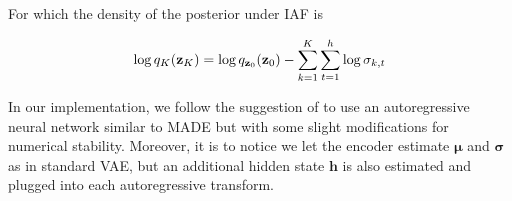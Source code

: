 \documentclass[12pt]{article}
\begin{document}
For which the density of the posterior under IAF is

\begin{equation}
    \log q_K(\textbf{z}_K) = \log q_{\textbf{z}_0}(\textbf{z}_0) - \sum_{k=1}^K \sum_{t=1}^h \log \sigma_{k,t}
\end{equation}

In our implementation, we follow the suggestion of \cite{Kingma2016ImprovedVI} to use an autoregressive neural network similar to MADE \cite{pmlr-v37-germain15} but with some slight modifications for numerical stability.
Moreover, it is to notice we let the encoder estimate \(\boldsymbol{\mu}\) and \(\boldsymbol{\sigma}\) as in standard VAE, but an additional hidden state \(\mathbf{h}\) is also estimated and plugged into each autoregressive transform. 



\end{document}
